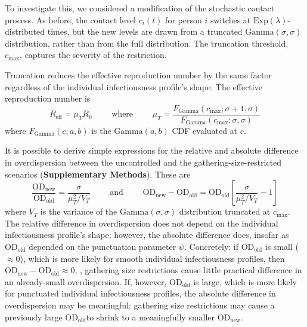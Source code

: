 To investigate this, we considered a modification of the stochastic contact process. As before, the contact level $c_i(t)$ for person $i$ switches at $\text{Exp}(\lambda)$-distributed times, but the new levels are  drawn from a truncated $\text{Gamma}(\sigma, \sigma)$ distribution, rather than from the full distribution. The truncation threshold, $c_\text{max}$, captures the severity of the restriction. 

Truncation reduces the effective reproduction number by the same factor regardless of the individual infectiousness profile's shape. The effective reproduction number is 
\begin{equation}
	R_\text{eff} = \mu_T R_0 \qquad \text{ where } \qquad \mu_T = \frac{F_\text{Gamma}(c_\text{max}; \sigma+1, \sigma)}{F_\text{Gamma}(c_\text{max}; \sigma, \sigma)}
\end{equation}
where $F_\text{Gamma}(c; a, b)$ is the $\text{Gamma}(a, b)$ CDF evaluated at $c$. 

It is possible to derive simple expressions for the relative and absolute difference in overdispersion between the uncontrolled and the gathering-size-restricted scenarios ({\bf Supplementary Methods}). These are 
\begin{equation}
\frac{\text{OD}_\text{new}}{\text{OD}_\text{old}} = \frac{\sigma}{\mu_T^2 / V_T}
\qquad \text{ and } \qquad
\text{OD}_\text{new} - \text{OD}_\text{old} = \text{OD}_\text{old} \left[ \frac{\sigma}{\mu_T^2 / V_T} - 1 \right]
\end{equation}
where $V_T$ is the variance of the $\text{Gamma}(\sigma, \sigma)$ distribution truncated at $c_\text{max}$. The relative difference in overdispersion does not depend on the individual infectiousness profile's shape; however, the absolute difference does, insofar as $\text{OD}_\text{old}$ depended on the punctuation parameter $\psi$. Concretely: if $\text{OD}_\text{old}$ is small ($\approx 0$), which is more likely for smooth individual infectiousness profiles, then $\text{OD}_\text{new} - \text{OD}_\text{old} \approx 0$, \ie, gathering size restrictions cause little practical difference in an already-small overdispersion. If, however, $\text{OD}_\text{old}$ is large, which is more likely for punctuated individual infectiousness profiles, the absolute difference in overdispersion may be meaningful: gathering size restrictions may cause a previously large $\text{OD}_\text{old}$to shrink to a meaningfully smaller $\text{OD}_\text{new}$. 

